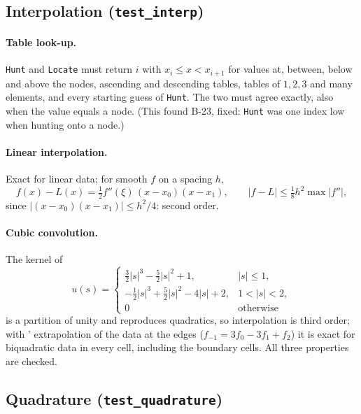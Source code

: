 \documentclass[11pt,a4paper]{article}
\newcommand{\code}[1]{\texttt{#1}}
\begin{document}
\subsection{Interpolation (\code{test\_interp})}
\paragraph{Table look-up.} \code{Hunt} and \code{Locate} must return
$i$ with $x_i\le x<x_{i+1}$ for values at, between, below and above the
nodes, ascending and descending tables, tables of $1,2,3$ and many
elements, and every starting guess of \code{Hunt}. The two must agree exactly, also when the value equals a node.
(This found B-23, fixed: \code{Hunt} was one index low when hunting
onto a node.)

\paragraph{Linear interpolation.} Exact for linear data; for smooth $f$
on a spacing $h$,
\begin{equation}
f(x) - L(x) = \tfrac12 f''(\xi)\,(x-x_0)(x-x_1),\qquad
|f-L| \le \tfrac18 h^2\max|f''|,
\end{equation}
since $|(x-x_0)(x-x_1)|\le h^2/4$: second order.

\paragraph{Cubic convolution.} The kernel of \citet{1981ITASS..29.1153K}
\begin{equation}
u(s) = \begin{cases}
\tfrac32|s|^3-\tfrac52|s|^2+1, & |s|\le1,\\
-\tfrac12|s|^3+\tfrac52|s|^2-4|s|+2, & 1<|s|<2,\\
0 & \text{otherwise}
\end{cases}
\end{equation}
is a partition of unity and reproduces quadratics, so interpolation is
third order; with \citeauthor{1981ITASS..29.1153K}' extrapolation of the data at the edges
($f_{-1} = 3f_0-3f_1+f_2$) it is exact for biquadratic data in every
cell, including the boundary cells. All three properties are checked.

\subsection{Quadrature (\code{test\_quadrature})}
\end{document}
